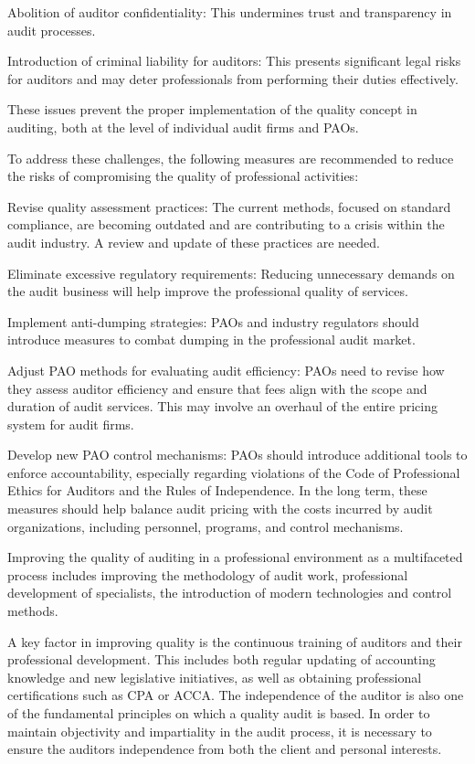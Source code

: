 \begin{multicols}{2}
Abolition of auditor confidentiality: This undermines trust and
transparency in audit processes.

Introduction of criminal liability for auditors: This presents
significant legal risks for auditors and may deter professionals from
performing their duties effectively.

These issues prevent the proper implementation of the quality concept in
auditing, both at the level of individual audit firms and PAOs.

To address these challenges, the following measures are recommended to
reduce the risks of compromising the quality of professional activities:

Revise quality assessment practices: The current methods, focused on
standard compliance, are becoming outdated and are contributing to a
crisis within the audit industry. A review and update of these practices
are needed.

Eliminate excessive regulatory requirements: Reducing unnecessary
demands on the audit business will help improve the professional quality
of services.

Implement anti-dumping strategies: PAOs and industry regulators should
introduce measures to combat dumping in the professional audit market.

Adjust PAO methods for evaluating audit efficiency: PAOs need to revise
how they assess auditor efficiency and ensure that fees align with the
scope and duration of audit services. This may involve an overhaul of
the entire pricing system for audit firms.

Develop new PAO control mechanisms: PAOs should introduce additional
tools to enforce accountability, especially regarding violations of the
Code of Professional Ethics for Auditors and the Rules of Independence.
In the long term, these measures should help balance audit pricing with
the costs incurred by audit organizations, including personnel,
programs, and control mechanisms.

Improving the quality of auditing in a professional environment as a
multifaceted process includes improving the methodology of audit work,
professional development of specialists, the introduction of modern
technologies and control methods.

A key factor in improving quality is the continuous training of auditors
and their professional development. This includes both regular updating
of accounting knowledge and new legislative initiatives, as well as
obtaining professional certifications such as CPA or ACCA. The
independence of the auditor is also one of the fundamental principles on
which a quality audit is based. In order to maintain objectivity and
impartiality in the audit process, it is necessary to ensure the
auditor\textquotesingle s independence from both the client and personal
interests.


\end{multicols}
